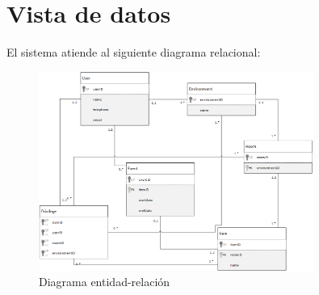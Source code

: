\chapter{Vista de datos}

El sistema atiende al siguiente diagrama relacional:


\begin{figure}[h!]
	\centering
	\includegraphics[width=0.8\textwidth]{4.Disenio/Imagenes/ER}
	\caption{Diagrama entidad-relación}
	\label{fig:ER}
\end{figure}







